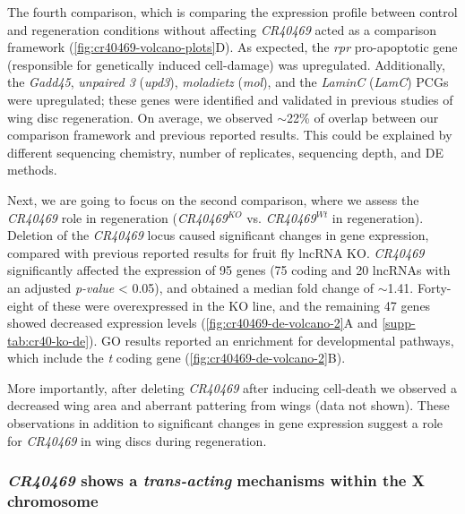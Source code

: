 The fourth comparison, which is comparing the expression profile between control and regeneration conditions without affecting \textit{CR40469} acted as a comparison framework (\autoref{fig:cr40469-volcano-plots}D). As expected, the \textit{rpr} pro-apoptotic gene (responsible for genetically induced cell-damage) was upregulated. Additionally, the \textit{Gadd45}, \textit{unpaired 3} (\textit{upd3}), \textit{moladietz} (\textit{mol}), and the \textit{LaminC} (\textit{LamC}) PCGs were upregulated; these genes were identified and validated in previous studies of wing disc regeneration.\autocite{vizcaya_2018, khan_2017_dme} On average, we observed $\sim$22\% of overlap between our comparison framework and previous reported results.\autocite{vizcaya_2018} This could be explained by different sequencing chemistry, number of replicates, sequencing depth, and DE methods.

Next, we are going to focus on the second comparison, where we assess the \textit{CR40469} role in regeneration (\textit{CR40469}$^{KO}$ vs. \textit{CR40469}$^{Wt}$ in regeneration). Deletion of the \textit{CR40469} locus caused significant changes in gene expression, compared with previous reported results for fruit fly lncRNA KO.\autocite{schor_2018} \textit{CR40469} significantly affected the expression of 95 genes (75 coding and 20 lncRNAs with an adjusted \textit{p-value} < 0.05), and obtained a median fold change of $\sim$1.41. Forty-eight of these were overexpressed in the KO line, and the remaining 47 genes showed decreased expression levels (\autoref{fig:cr40469-de-volcano-2}A and \autoref{supp-tab:cr40-ko-de}). GO results reported an enrichment for developmental pathways, which include the \textit{t} coding gene (\autoref{fig:cr40469-de-volcano-2}B).  

More importantly, after deleting \textit{CR40469} after inducing cell-death we observed a decreased wing area and aberrant pattering from wings (data not shown). These observations in addition to significant changes in gene expression suggest a role for \textit{CR40469} in wing discs during regeneration. 

\clearpage

\subsubsection{\textit{CR40469} shows a \textit{trans-acting} mechanisms within the X chromosome}
\label{sub-sub-sec:cis-acting}

